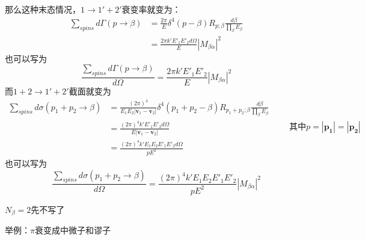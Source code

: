 那么这种末态情况，$1\to1'+2'$衰变率就变为：
\begin{equation}
    \begin{aligned}
        \sum_{spins}d\Gamma(p\to\beta)
        &=\frac{2\pi}{E}\delta^4(p-\beta)R_{p;\beta}\frac{d\beta}{\prod_{\beta}E_{\beta}}
        \\&=\frac{2\pi k'E'_1E'_2d\Omega}{E}|M_{\beta\alpha}|^2
    \end{aligned}
\end{equation}
也可以写为
\begin{equation}
    \frac{\sum_{spins}d\Gamma(p\to\beta)}{d\Omega}=\frac{2\pi k'E'_1E'_2}{E}|M_{\beta\alpha}|^2
\end{equation}
而$1+2\to1'+2'$截面就变为
\begin{equation}
    \begin{aligned}
            \sum_{spins}d\sigma(p_1+p_2\to\beta)
            &=
            \frac{(2\pi)^4}{E_1E_2|\boldsymbol{v}_1-\boldsymbol{v}_2|}\delta^4(p_1+p_2-\beta)R_{p_1+p_2;\beta}\frac{d\beta}{\prod_{\beta}E_{\beta}}\\
            &=
            \frac{(2\pi)^4k'E'_1E'_2d\Omega}{E|\boldsymbol{v}_1-\boldsymbol{v}_2|}
            \\&=
            \frac{(2\pi)^4k'E_1E_2E'_1E'_2d\Omega}{pE^2}
    \end{aligned}\qquad \text{其中}p=|\boldsymbol{p_1}|=|\boldsymbol{p_2}|
\end{equation}
也可以写为
\begin{equation}
    \frac{\sum_{spins}d\sigma(p_1+p_2\to\beta)}{d\Omega}=\frac{(2\pi)^4k'E_1E_2E'_1E'_2}{pE^2}|M_{\beta\alpha}|^2
\end{equation}


$N_{\beta}=2$先不写了

举例：$\pi$衰变成中微子和谬子


